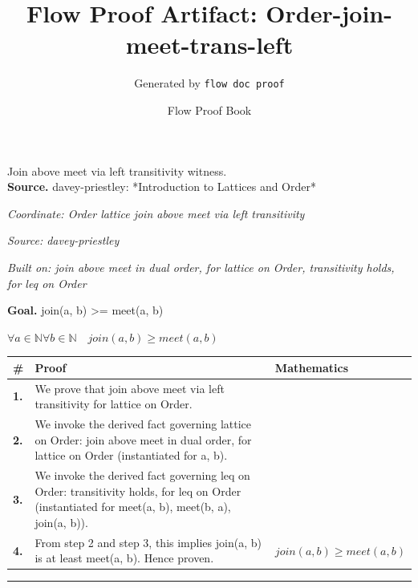 \documentclass[11pt]{article}
\title{Flow Proof Artifact: Order-join-meet-trans-left}
\author{Generated by \texttt{flow doc proof}}
\date{Flow Proof Book}
\theoremstyle{definition}
\begin{document}
\maketitle
Join above meet via left transitivity witness.\\[0.5em]
\textbf{Source.} davey-priestley: *Introduction to Lattices and Order*\\[0.5em]
\bigskip
{}\par
\smallskip\noindent\textit{Coordinate: Order \cdot lattice \cdot join above meet via left transitivity}\par
\smallskip\noindent\textit{Source: davey-priestley}\par
\smallskip\noindent\textit{Built on: join above meet in dual order, for lattice on Order, transitivity holds, for leq on Order}\par
\medskip
\noindent\textbf{Goal.} join(a, b) >= meet(a, b)\par
\noindent$\displaystyle \forall a \in \mathbb{N} \forall b \in \mathbb{N}\quad join(a, b) \ge meet(a, b)$\par
\medskip
\noindent
\begin{tabular}{@{} >{\raggedright\arraybackslash}p{} >{\raggedright\arraybackslash}p{} >{\raggedleft\arraybackslash}p{} @{}}
\textbf{\#} & \textbf{Proof} & \textbf{Mathematics} \\
\midrule
\textbf{1.} & We prove that join above meet via left transitivity for lattice on Order. & \\[0.45em]
\textbf{2.} & We invoke the derived fact governing lattice on Order: join above meet in dual order, for lattice on Order (instantiated for a, b). & \\[0.45em]
\textbf{3.} & We invoke the derived fact governing leq on Order: transitivity holds, for leq on Order (instantiated for meet(a, b), meet(b, a), join(a, b)). & \\[0.45em]
\textbf{4.} & From step 2 and step 3, this implies join(a, b) is at least meet(a, b). Hence proven. & $\displaystyle join(a, b) \ge meet(a, b)$ \\[0.45em]
\bottomrule
\end{tabular}
\label{thm:Order-lattice-join_above_meet_via_left_transitivity}
\par\medskip\hrule
\end{document}
